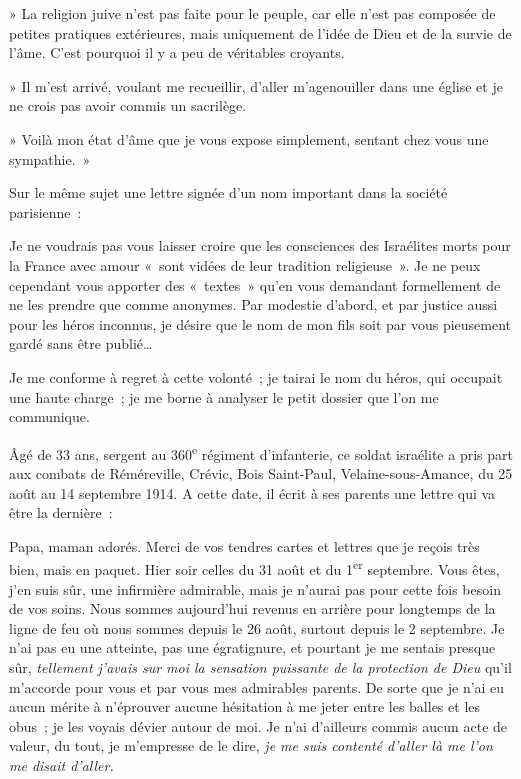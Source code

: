 \documentclass[french,twoside]{book} %
\newcommand{\bibl}[1]{{\RaggedLeft{#1}\par\bigskip}}
\begin{document}
{ » La religion juive n’est pas faite pour le peuple, car elle n’est pas composée de petites pratiques extérieures, mais uniquement de l’idée de Dieu et de la survie de l’âme. C’est pourquoi il y a peu de véritables croyants.‌\par
 » Il m’est arrivé, voulant me recueillir, d’aller m’agenouiller dans une église et je ne crois pas avoir commis un sacrilège.‌\par
 » Voilà mon état d’âme que je vous expose simplement, sentant chez vous une sympathie. »‌\par
 
\bibl{(Lettre du sous-lieutenant L., 29 décembre 1916.)‌}
\par
 \noindent Sur le même sujet une lettre signée d’un nom important dans la société parisienne :‌\par
  \noindent Je ne voudrais pas vous laisser croire que les consciences des Israélites morts pour la France avec amour « sont vidées de leur tradition religieuse ». Je ne peux cependant vous apporter des « textes » qu’en vous demandant formellement de ne les prendre que comme anonymes. Par modestie d’abord, et par justice aussi pour les héros inconnus, je désire que le nom de mon fils soit par vous pieusement gardé sans être publié…‌
 \par
\noindent Je me conforme à regret à cette volonté ; je tairai le nom du héros, qui occupait une haute charge ; je me borne à analyser le petit dossier que l’on me communique.‌\par
 Âgé de 33 ans, sergent au 360\textsuperscript{e} régiment d’infanterie, ce soldat israélite a pris part aux combats de Réméreville, Crévic, Bois Saint-Paul, Velaine-sous-Amance, du 25 août au 14 septembre 1914. A cette date, il écrit à ses parents une lettre qui va être la dernière :‌\par
  \noindent Papa, maman adorés. Merci de vos tendres cartes et lettres que je reçois très bien, mais en paquet. Hier soir celles du 31 août et du 1\textsuperscript{er} septembre. Vous êtes, j’en suis sûr, une infirmière admirable, mais je n’aurai pas pour cette fois besoin de vos soins. Nous sommes aujourd’hui revenus en arrière pour longtemps de la ligne de feu où nous sommes depuis le 26 août, surtout depuis le 2 septembre. Je n’ai pas eu une atteinte, pas une égratignure, et pourtant je me sentais presque sûr, {\itshape tellement j’avais sur moi la sensation puissante de la protection de Dieu} qu’il m’accorde pour vous et par vous mes admirables parents. De sorte que je n’ai eu aucun mérite à n’éprouver aucune hésitation à me jeter entre les balles et les obus ; je les voyais dévier autour de moi. Je n’ai d’ailleurs commis aucun acte de valeur, du tout, je m’empresse de le dire, {\itshape je me suis contenté d’aller là me l’on me disait d’aller.} ‌
}
\end{document}
